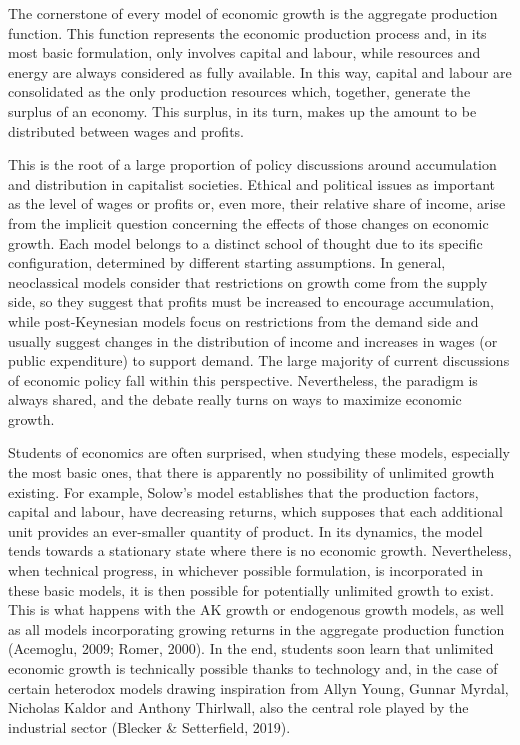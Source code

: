 \documentclass[
]{book}
\begin{document}
The cornerstone of every model of economic growth is the aggregate production function. This function represents the economic production process and, in its most basic formulation, only involves capital and labour, while resources and energy are always considered as fully available. In this way, capital and labour are consolidated as the only production resources which, together, generate the surplus of an economy. This surplus, in its turn, makes up the amount to be distributed between wages and profits.

This is the root of a large proportion of policy discussions around accumulation and distribution in capitalist societies. Ethical and political issues as important as the level of wages or profits or, even more, their relative share of income, arise from the implicit question concerning the effects of those changes on economic growth. Each model belongs to a distinct school of thought due to its specific configuration, determined by different starting assumptions. In general, neoclassical models consider that restrictions on growth come from the supply side, so they suggest that profits must be increased to encourage accumulation, while post-Keynesian models focus on restrictions from the demand side and usually suggest changes in the distribution of income and increases in wages (or public expenditure) to support demand. The large majority of current discussions of economic policy fall within this perspective. Nevertheless, the paradigm is always shared, and the debate really turns on ways to maximize economic growth.

Students of economics are often surprised, when studying these models, especially the most basic ones, that there is apparently no possibility of unlimited growth existing. For example, Solow's model establishes that the production factors, capital and labour, have decreasing returns, which supposes that each additional unit provides an ever-smaller quantity of product. In its dynamics, the model tends towards a stationary state where there is no economic growth. Nevertheless, when technical progress, in whichever possible formulation, is incorporated in these basic models, it is then possible for potentially unlimited growth to exist. This is what happens with the AK growth or endogenous growth models, as well as all models incorporating growing returns in the aggregate production function (Acemoglu, 2009; Romer, 2000). In the end, students soon learn that unlimited economic growth is technically possible thanks to technology and, in the case of certain heterodox models drawing inspiration from Allyn Young, Gunnar Myrdal, Nicholas Kaldor and Anthony Thirlwall, also the central role played by the industrial sector (Blecker \& Setterfield, 2019).
\end{document}
